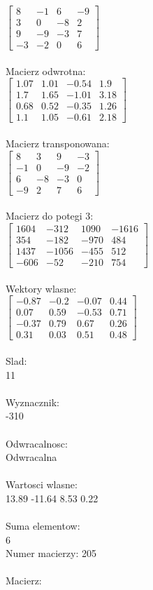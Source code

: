 \documentclass[a4paper,12pt]{article}
\begin{document}
$\begin{bmatrix} 8&-1&6&-9\\3&0&-8&2\\9&-9&-3&7\\-3&-2&0&6 \end{bmatrix}$
\\
\\
Macierz odwrotna:\\

$\begin{bmatrix} 1.07&1.01&-0.54&1.9\\1.7&1.65&-1.01&3.18\\0.68&0.52&-0.35&1.26\\1.1&1.05&-0.61&2.18 \end{bmatrix}$
\\
\\
Macierz transponowana:\\

$\begin{bmatrix} 8&3&9&-3\\-1&0&-9&-2\\6&-8&-3&0\\-9&2&7&6 \end{bmatrix}$
\\
\\
Macierz do potegi 3:\\

$\begin{bmatrix} 1604&-312&1090&-1616\\354&-182&-970&484\\1437&-1056&-455&512\\-606&-52&-210&754 \end{bmatrix}$
\\
\\
Wektory wlasne:\\

$\begin{bmatrix} -0.87&-0.2&-0.07&0.44\\0.07&0.59&-0.53&0.71\\-0.37&0.79&0.67&0.26\\0.31&0.03&0.51&0.48 \end{bmatrix}$
\\
\\
Slad:\\
11
\\
\\
Wyznacznik:\\
-310
\\
\\
Odwracalnosc:\\
Odwracalna
\\
\\
Wartosci wlasne:\\
13.89 -11.64 8.53 0.22
\\
\\
Suma elementow:\\
6
\\
\newpage
Numer macierzy:
205
\\
\\
Macierz:\\
\end{document}

